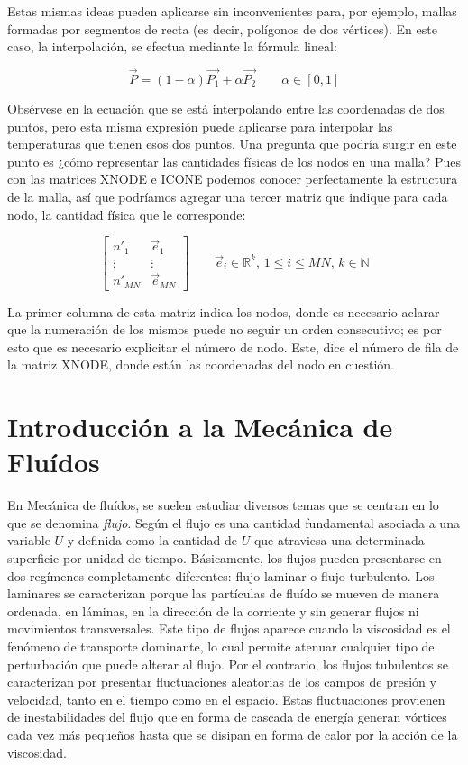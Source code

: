 Estas mismas ideas pueden aplicarse sin inconvenientes para, por ejemplo, mallas formadas por segmentos de recta (es decir, polígonos de dos vértices). En este caso, la interpolación, se efectua mediante la fórmula lineal:

\begin{equation}
  \label{eq:interpolacionlineal}
  \vec{P} = (1-\alpha)\vec{P_1} + \alpha\vec{P_2} \qquad \alpha\in[0,1]
\end{equation}

Obsérvese en la ecuación que se está interpolando entre las coordenadas de dos puntos, pero esta misma expresión puede aplicarse para interpolar las temperaturas que tienen esos dos puntos.
Una pregunta que podría surgir en este punto es ¿cómo representar las cantidades físicas de los nodos en una malla? Pues con las matrices XNODE e ICONE podemos conocer perfectamente la estructura de la malla, así que podríamos agregar una tercer matriz que indique para cada nodo, la cantidad física que le corresponde:

\begin{equation}
  \label{eq:estados}
  \begin{bmatrix}
    n'_{1} & \vec{e}_{1} \\
    \vdots & \vdots \\
    n'_{MN} & \vec{e}_{MN}
  \end{bmatrix}
  \qquad \vec{e}_i\in\mathbb{R}^k,\,1\leq i\leq MN,\,k\in \mathbb{N}
\end{equation}

La primer columna de esta matriz indica los nodos, donde es necesario aclarar que la numeración de los mismos puede no seguir un orden consecutivo; es por esto que es necesario explicitar el número de nodo. Este, dice el número de fila de la matriz XNODE, donde están las coordenadas del nodo en cuestión.

\section{Introducción a la Mecánica de Fluídos}

	En Mecánica de fluídos, se suelen estudiar diversos temas que se centran en lo que se denomina \emph{flujo}. Según \cite{Hirsch} el flujo es una cantidad fundamental asociada a una variable $U$ y definida como la cantidad de $U$ que atraviesa una determinada superficie por unidad de tiempo. Básicamente, los flujos pueden presentarse en dos regímenes completamente diferentes: flujo laminar o flujo turbulento. Los laminares se caracterizan porque las partículas de fluído se mueven de manera ordenada, en láminas, en la dirección de la corriente y sin generar flujos ni movimientos transversales. Este tipo de flujos aparece cuando la viscosidad es el fenómeno de transporte dominante, lo cual permite atenuar cualquier tipo de perturbación que puede alterar al flujo. Por el contrario, los flujos tubulentos se caracterizan por presentar fluctuaciones aleatorias de los campos de presión y velocidad, tanto en el tiempo como en el espacio. Estas fluctuaciones provienen de inestabilidades del flujo que en forma de cascada de energía generan vórtices cada vez más pequeños hasta que se disipan en forma de calor por la acción de la viscosidad.

